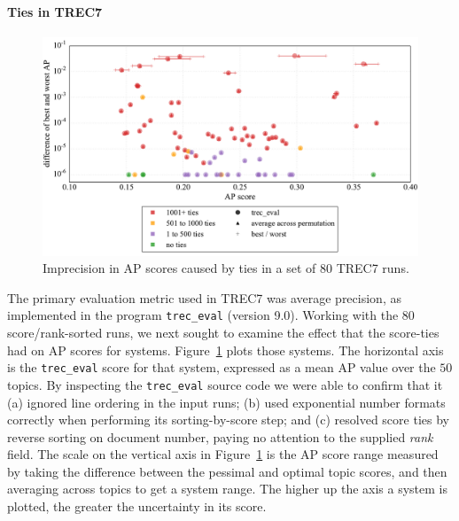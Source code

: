 \documentclass[runningheads,a4paper]{llncs}
\newcommand{\myparagraph}[1]{\vspace*{-0.7ex}\paragraph*{\normalsize\bf{#1}}}
\newcommand{\treceval}{{\tt\small{trec\_eval}}}
\begin{document}
\myparagraph{Ties in TREC7}

\begin{figure}[t!]
\centering
\includegraphics[width=1\textwidth]{figs/fig-trec7-ap-scores.pdf}
\caption{Imprecision in AP scores caused by ties in a set of $80$
TREC7 runs.
\label{fig-trec7-ap-scores}}
\end{figure}

The primary evaluation metric used in TREC7 was average precision, as
implemented in the program {\treceval} (version 9.0).
Working with the $80$ score/rank-sorted runs, we next sought to
examine the effect that the score-ties had on AP scores for systems.
Figure~\ref{fig-trec7-ap-scores} plots those systems.
The horizontal axis is the {\treceval} score for that system,
expressed as a mean AP value over the $50$ topics.
By inspecting the {\treceval} source code we were able to confirm
that it (a) ignored line ordering in the input runs; (b) used
exponential number formats correctly when performing its
sorting-by-score step; and (c) resolved score ties by reverse sorting
on document number, paying no attention to the supplied {\emph{rank}}
field.
The scale on the vertical axis in Figure~\ref{fig-trec7-ap-scores} is
the AP score range measured by taking the difference between the
pessimal and optimal topic scores, and then averaging across topics
to get a system range.
The higher up the axis a system is plotted, the greater the
uncertainty in its score.
\end{document}
